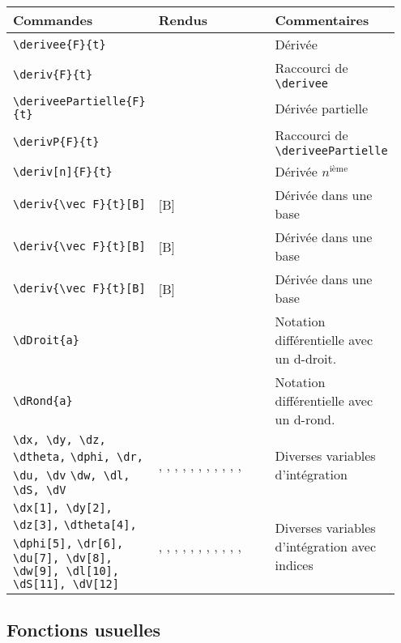 \documentclass[a4paper,10pt]{article}
\begin{document}
			\noindent
			\begin{tabular}{|p{0.35\linewidth}|p{0.3\linewidth}|p{0.3\linewidth}|}
				\hline
					\textbf{Commandes}&\textbf{Rendus}&\textbf{Commentaires}
				\\\hline\hline
					\verb!\derivee{F}{t}!		&	\derivee {F}{t}			&	Dérivée
				\\\hline
					\verb!\deriv{F}{t}!		&	\deriv {F}{t}			&	Raccourci de \verb!\derivee!
				\\\hline	
					\verb!\deriveePartielle{F}{t}!		&	\deriveePartielle {F}{t}			&	Dérivée partielle
				\\\hline
					\verb!\derivP{F}{t}!		&	\derivP {F}{t}			&	Raccourci de \verb!\deriveePartielle!
				\\\hline
					\verb!\deriv[n]{F}{t}!		&	\deriv[n] {F}{t}			&	Dérivée $n^\text{ième}$
				\\\hline
					\verb!\deriv{\vec F}{t}[B]!		&	\deriv {\vec F}{t}[B]			&	Dérivée dans une base
				\\\hline
					\verb!\deriv{\vec F}{t}[B]!		&	\deriv {\vec F}{t}[B]			&	Dérivée dans une base
				\\\hline
					\verb!\deriv{\vec F}{t}[B]!		&	\deriv {\vec F}{t}[B]			&	Dérivée dans une base
				\\\hline
					\verb!\dDroit{a}!		&		\dDroit{a}		&	Notation différentielle avec un d-droit.
				\\\hline
					\verb!\dRond{a}!		&		\dRond{a}		&	Notation différentielle avec un d-rond.
				\\\hline
					\verb!\dx, \dy, \dz, \dtheta,! \verb!\dphi, \dr, \du, \dv! \verb!\dw, \dl, \dS, \dV!		&	\dx, \dy, \dz, \dtheta, \dphi, \du, \dv, \dw, \dr, \dl, \dS, \dV			&	Diverses variables d'intégration
				\\\hline
					\verb!\dx[1], \dy[2], \dz[3],! \verb!\dtheta[4], \dphi[5],! \verb!\dr[6], \du[7], \dv[8],! \verb!\dw[9], \dl[10],! \verb!\dS[11], \dV[12]!		&		\dx[1], \dy[2], \dz[3], \dtheta[4], \dphi[5], \dr[6], \du[7], \dv[8], \dw[9], \dl[10], \dS[11], \dV[12]		&	Diverses variables d'intégration avec indices
				\\\hline
			\end{tabular}


		\subsection{Fonctions usuelles}
\end{document}
